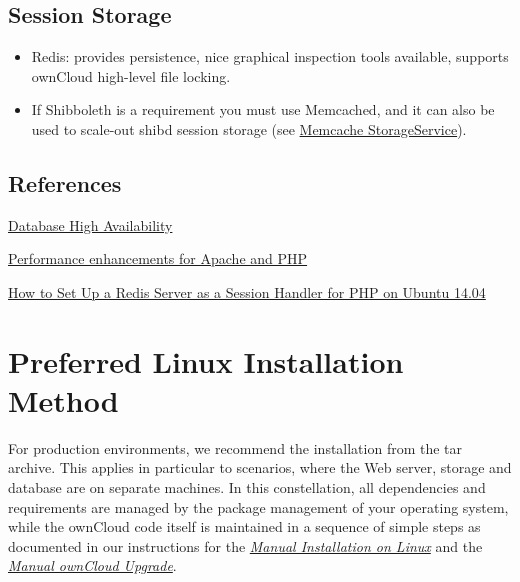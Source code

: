\documentclass[letterpaper,10pt,english]{sphinxmanual}
\begin{document}
\subsection{Session Storage}
\label{installation/deployment_recommendations:session-storage}\begin{itemize}
\item {} 
Redis: provides persistence, nice graphical inspection tools available,
supports ownCloud high-level file locking.

\item {} 
If Shibboleth is a requirement you must use Memcached, and it can also be
used to scale-out shibd session storage (see \href{https://wiki.shibboleth.net/confluence/display/SHIB2/NativeSPStorageService\#NativeSPStorageService-MemcacheStorageService}{Memcache StorageService}).

\end{itemize}


\subsection{References}
\label{installation/deployment_recommendations:references}
\href{http://www.severalnines.com/blog/become-mysql-dba-blog-series-database-high-availability}{Database High Availability}

\href{http://blog.bitnami.com/2014/06/performance-enhacements-for-apache-and.html}{Performance enhancements for Apache and PHP}

\href{https://www.digitalocean.com/community/tutorials/how-to-set-up-a-redis-server-as-a-session-handler-for-php-on-ubuntu-14-04}{How to Set Up a Redis Server as a Session Handler for PHP on Ubuntu 14.04}


\section{Preferred Linux Installation Method}
\label{installation/linux_installation:preferred-linux-installation-method}\label{installation/linux_installation:haproxy-documentation}\label{installation/linux_installation::doc}
For production environments, we recommend the installation from the tar archive.
This applies in particular to scenarios, where the Web server, storage and database are on separate machines.
In this constellation, all dependencies and requirements are managed by the package management
of your operating system, while the ownCloud code itself is maintained in a sequence of simple steps
as documented in our instructions for the {\hyperref[installation/source_installation::doc]{\emph{\emph{Manual Installation on Linux}}}} and the {\hyperref[maintenance/manual_upgrade::doc]{\emph{\emph{Manual ownCloud Upgrade}}}}.
\end{document}
